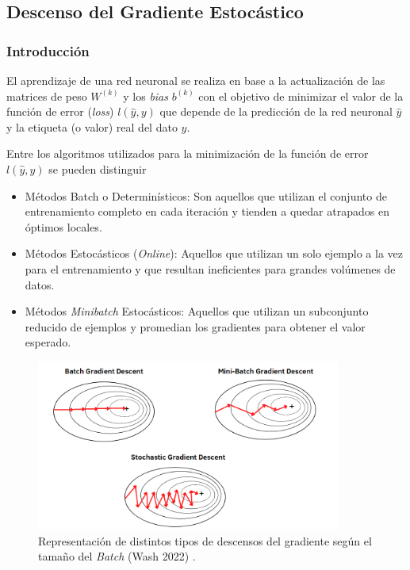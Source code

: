 \subsection{Descenso del Gradiente Estocástico} 

\subsubsection{Introducción }

El aprendizaje de una red neuronal se realiza en base a la actualización de las matrices de peso $W^{(k)}$ y los \textit{bias} $b^{(k)}$ con el objetivo de minimizar el valor de la función de error (\textit{loss}) $l(\hat{y},y)$ que depende de la predicción de la red neuronal $\hat{y}$ y la etiqueta (o valor) real del dato $y$. 

\vspace{0.2cm}

Entre los algoritmos utilizados para la minimización de la función de error $l(\hat{y},y)$ se pueden distinguir 
\begin{itemize}
    \item Métodos Batch o Determinísticos: Son aquellos que utilizan el conjunto de entrenamiento completo en cada iteración y tienden a quedar atrapados en óptimos locales. 
    
    \item Métodos Estocásticos (\textit{Online}): Aquellos que utilizan un solo ejemplo a la vez para el entrenamiento y que resultan ineficientes para grandes volúmenes de datos. 
    
    \item Métodos \textit{Minibatch} Estocásticos: Aquellos que utilizan un subconjunto reducido de ejemplos y promedian los gradientes para obtener el valor esperado.
    
\end{itemize}

\begin{figure}[ht]
    \centering
    \includegraphics[width=10cm]{img/tesis/SGD.png}
    \caption{Representación de distintos tipos de descensos del gradiente según el tamaño del \textit{Batch} (Wash 2022) \cite{GradientDescent}.}
    \label{fig:SGD}
\end{figure}

